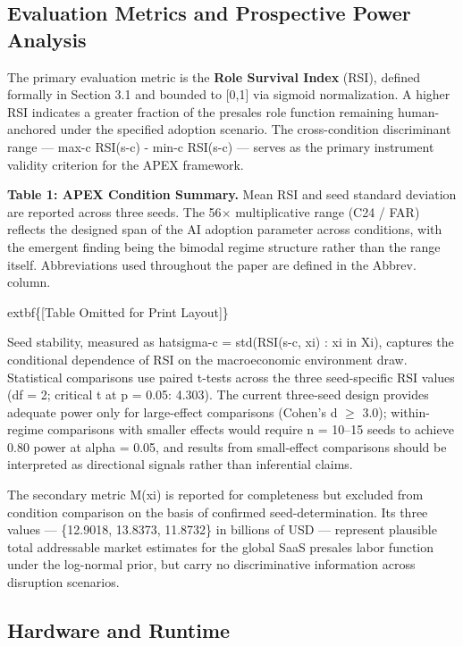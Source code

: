 \documentclass[10pt, conference]{IEEEtran}
\begin{document}
{\subsection{Evaluation Metrics and Prospective Power Analysis}

\label{sec:evaluation_metrics_and_prospective_power}

The primary evaluation metric is the \textbf{Role Survival Index} (RSI), defined formally in Section 3.1 and bounded to [0,1] via sigmoid normalization. A higher RSI indicates a greater fraction of the presales role function remaining human-anchored under the specified adoption scenario. The cross-condition discriminant range --- max-c RSI(s-c) - min-c RSI(s-c) --- serves as the primary instrument validity criterion for the APEX framework.

\textbf{Table 1: APEX Condition Summary.} Mean RSI and seed standard deviation are reported across three seeds. The 56$\times$ multiplicative range (C24 / FAR) reflects the designed span of the AI adoption parameter across conditions, with the emergent finding being the bimodal regime structure rather than the range itself. Abbreviations used throughout the paper are defined in the Abbrev. column.

	extbf\{[Table Omitted for Print Layout]\}

Seed stability, measured as hatsigma-c = std(RSI(s-c, xi) : xi in Xi), captures the conditional dependence of RSI on the macroeconomic environment draw. Statistical comparisons use paired t-tests across the three seed-specific RSI values (df = 2; critical t at p = 0.05: 4.303). The current three-seed design provides adequate power only for large-effect comparisons (Cohen's d $\geq$ 3.0); within-regime comparisons with smaller effects would require n = 10--15 seeds to achieve 0.80 power at alpha = 0.05, and results from small-effect comparisons should be interpreted as directional signals rather than inferential claims.

The secondary metric M(xi) is reported for completeness but excluded from condition comparison on the basis of confirmed seed-determination. Its three values --- \{12.9018, 13.8373, 11.8732\} in billions of USD --- represent plausible total addressable market estimates for the global SaaS presales labor function under the log-normal prior, but carry no discriminative information across disruption scenarios.

\subsection{Hardware and Runtime}

}
\end{document}
